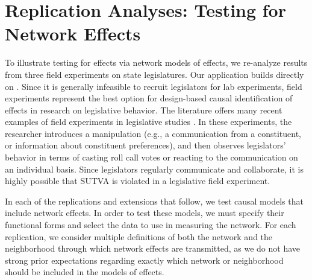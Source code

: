 \documentclass[12pt]{article}
\begin{document}
\section{Replication Analyses: Testing for Network Effects}

To illustrate testing for effects via network models of effects, we re-analyze results from three field experiments on state legislatures. Our application builds directly on \citet{coppock2014information}. Since it is generally infeasible to recruit legislators for lab experiments, field experiments represent the best option for design-based causal identification of effects in research on legislative behavior. The literature offers many recent examples of field experiments in legislative studies \citep[e.g., ][]{bergan2009does,butler2011politicians,butler2012field,broockman2013black,nyhan2015effect,bergan2015call}. In these experiments, the researcher introduces a manipulation (e.g., a communication from a constituent, or information about constituent preferences), and then observes legislators' behavior in terms of casting roll call votes or reacting to the communication on an individual basis. Since legislators regularly communicate and collaborate, it is highly possible that SUTVA is violated in a legislative field experiment. 

In each of the replications and extensions that follow, we test causal models that include network effects. In order to test these models, we must specify their functional forms and select the data to use in measuring the network. For each replication, we consider multiple definitions of both the network and the neighborhood through which network effects are transmitted, as we do not have strong prior expectations regarding exactly which network or neighborhood should be included in the models of effects. 
\end{document}
